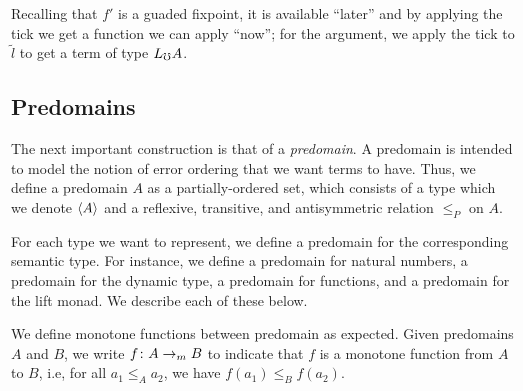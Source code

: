 Recalling that $f'$ is a guaded fixpoint, it is available ``later'' and by
applying the tick we get a function we can apply ``now''; for the argument,
we apply the tick to $\tilde{l}$ to get a term of type $L_\mho A$.




\subsection{Predomains}

The next important construction is that of a \emph{predomain}. A predomain is intended to
model the notion of error ordering that we want terms to have. Thus, we define a predomain $A$
as a partially-ordered set, which consists of a type which we denote $\langle {A} \rangle$ and a reflexive,
transitive, and antisymmetric relation $\le_P$ on $A$.

For each type we want to represent, we define a predomain for the corresponding semantic
type. For instance, we define a predomain for natural numbers, a predomain for the
dynamic type, a predomain for functions, and a predomain for the lift monad. We
describe each of these below.

We define monotone functions between predomain as expected. Given predomains
$A$ and $B$, we write $f \colon A \to_m B$ to indicate that $f$ is a monotone
function from $A$ to $B$, i.e, for all $a_1 \le_A a_2$, we have $f(a_1) \le_B f(a_2)$.

